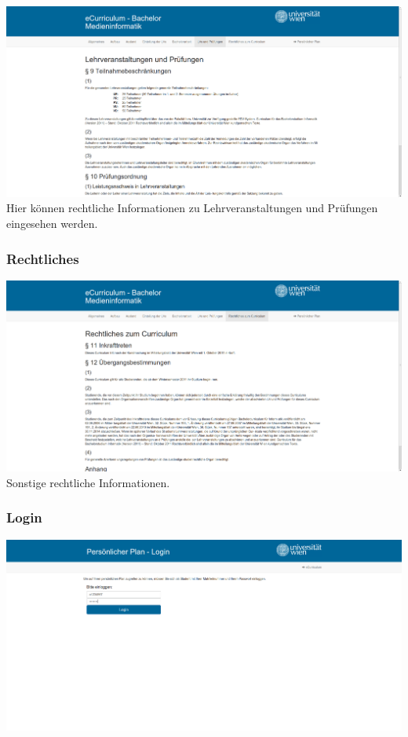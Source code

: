 \documentclass[a4paper,10pt]{scrartcl}
\begin{document}
\includegraphics[scale=0.19]{./hifi_screenshots/hifi_lv.png}\\

Hier können rechtliche Informationen zu Lehrveranstaltungen und Prüfungen eingesehen werden.

\subsubsection{Rechtliches}

\includegraphics[scale=0.19]{./hifi_screenshots/hifi_recht.png}\\

Sonstige rechtliche Informationen.

\subsubsection{Login}

\includegraphics[scale=0.19]{./hifi_screenshots/hifi_login.png}\\
\end{document}
